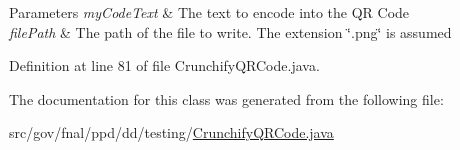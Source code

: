 \begin{DoxyParams}{Parameters}
{\em my\-Code\-Text} & The text to encode into the Q\-R Code \\
\hline
{\em file\-Path} & The path of the file to write. The extension \char`\"{}.\-png\char`\"{} is assumed \\
\hline
\end{DoxyParams}


Definition at line 81 of file Crunchify\-Q\-R\-Code.\-java.



The documentation for this class was generated from the following file\-:\begin{DoxyCompactItemize}
\item 
src/gov/fnal/ppd/dd/testing/\hyperlink{CrunchifyQRCode_8java}{Crunchify\-Q\-R\-Code.\-java}\end{DoxyCompactItemize}
